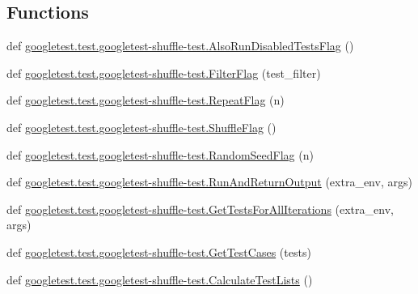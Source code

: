 \subsection*{Functions}
\begin{DoxyCompactItemize}
\item 
def \mbox{\hyperlink{namespacegoogletest_1_1test_1_1googletest-shuffle-test_a73fb59e0874bd06e935f7dae5f3a143f}{googletest.\+test.\+googletest-\/shuffle-\/test.\+Also\+Run\+Disabled\+Tests\+Flag}} ()
\item 
def \mbox{\hyperlink{namespacegoogletest_1_1test_1_1googletest-shuffle-test_a244d0da1ad0a42553d1153f4978391c6}{googletest.\+test.\+googletest-\/shuffle-\/test.\+Filter\+Flag}} (test\+\_\+filter)
\item 
def \mbox{\hyperlink{namespacegoogletest_1_1test_1_1googletest-shuffle-test_a42253bced1b3a534fe13c6a90585a21e}{googletest.\+test.\+googletest-\/shuffle-\/test.\+Repeat\+Flag}} (n)
\item 
def \mbox{\hyperlink{namespacegoogletest_1_1test_1_1googletest-shuffle-test_a19a50de0ca6a1f7f5456689b2b90223d}{googletest.\+test.\+googletest-\/shuffle-\/test.\+Shuffle\+Flag}} ()
\item 
def \mbox{\hyperlink{namespacegoogletest_1_1test_1_1googletest-shuffle-test_aa8b02fd804af8066de866aedd758c5a4}{googletest.\+test.\+googletest-\/shuffle-\/test.\+Random\+Seed\+Flag}} (n)
\item 
def \mbox{\hyperlink{namespacegoogletest_1_1test_1_1googletest-shuffle-test_aa7955f69809be00aa29ee9ace1f5c99f}{googletest.\+test.\+googletest-\/shuffle-\/test.\+Run\+And\+Return\+Output}} (extra\+\_\+env, args)
\item 
def \mbox{\hyperlink{namespacegoogletest_1_1test_1_1googletest-shuffle-test_afa42885313ae30eb06df1caec30186d9}{googletest.\+test.\+googletest-\/shuffle-\/test.\+Get\+Tests\+For\+All\+Iterations}} (extra\+\_\+env, args)
\item 
def \mbox{\hyperlink{namespacegoogletest_1_1test_1_1googletest-shuffle-test_af1bfd12ecdd2727073cb53a3709cc448}{googletest.\+test.\+googletest-\/shuffle-\/test.\+Get\+Test\+Cases}} (tests)
\item 
def \mbox{\hyperlink{namespacegoogletest_1_1test_1_1googletest-shuffle-test_aec84d8690d7bdc6863c19e91a4595a4f}{googletest.\+test.\+googletest-\/shuffle-\/test.\+Calculate\+Test\+Lists}} ()
\end{DoxyCompactItemize}
